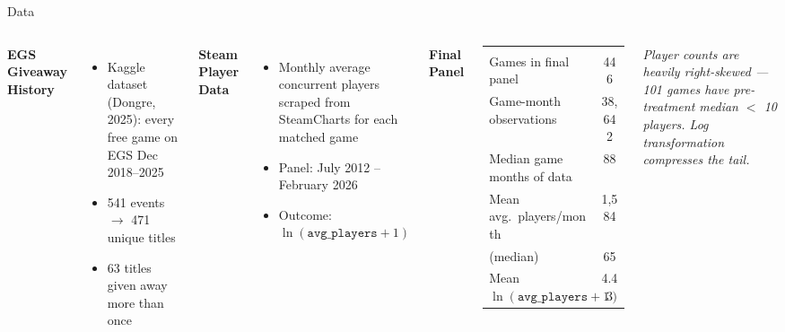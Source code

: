 \documentclass[10pt,aspectratio=169]{beamer}
\begin{document}
\begin{frame}{Data}

\begin{columns}[T]
  \textbf{EGS Giveaway History}
  \begin{itemize}
    \item Kaggle dataset (Dongre, 2025): every free game on EGS Dec 2018--2025
    \item 541 events $\rightarrow$ \alert{471 unique titles}
    \item 63 titles given away more than once
  \end{itemize}

  \vspace{0.5em}
  \textbf{Steam Player Data}
  \begin{itemize}
    \item Monthly average concurrent players scraped from SteamCharts for each matched game
    \item Panel: July 2012 -- February 2026
    \item Outcome: $\ln(\texttt{avg\_players} + 1)$
  \end{itemize}

  \textbf{Final Panel}

  \vspace{0.3em}
  \begin{tabular}{lc}
    \toprule
    & \\[-0.8em]
    Games in final panel & \alert{446} \\
    Game-month observations & \alert{38,642} \\
    Median game months of data & 88 \\
    \midrule
    Mean avg.\ players/month & 1,584 \\
    \quad (median) & 65 \\
    Mean $\ln(\texttt{avg\_players}+1)$ & 4.43 \\
    \bottomrule
  \end{tabular}

  \vspace{0.6em}
  \textit{\small Player counts are heavily right-skewed --- 101 games have pre-treatment median $<$ 10 players. Log transformation compresses the tail.}

\end{columns}

\end{frame}
\end{document}
